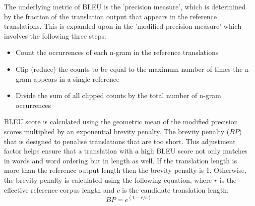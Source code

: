

The underlying metric of \acrshort{BLEU} is the 'precision measure', which is determined by the fraction of the translation output that appears in the reference translations. This is expanded upon in the 'modified precision measure' which involves the following three steps:
\begin{itemize}
    \item Count the occurrences of each n-gram in the reference translations
    \item Clip (reduce) the counts to be equal to the maximum number of times the n-gram appears in a single reference
    \item Divide the sum of all clipped counts by the total number of n-gram occurrences
\end{itemize}

\acrshort{BLEU} score is calculated using the geometric mean of the modified precision scores multiplied by an exponential brevity penalty.
The brevity penalty ($BP$) that is designed to penalise translations that are too short. This adjustment factor helps ensure that a translation with a high \acrshort{BLEU} score not only matches in words and word ordering but in length as well.
If the translation length is more than the reference output length then the brevity penalty is 1. Otherwise, the brevity penalty is calculated using the following equation, where $r$ is the effective reference corpus length and $c$ is the candidate translation length:
\begin{equation}
    BP = e^{(1-r/c)}
\end{equation}



